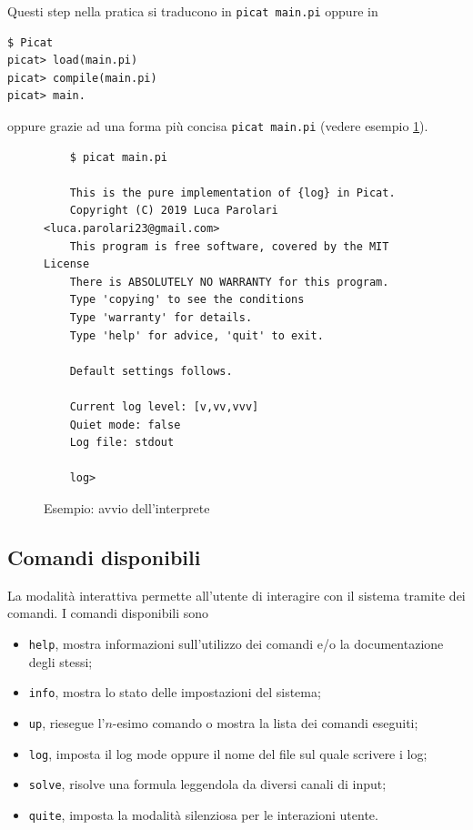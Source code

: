 \documentclass[12pt,a4paper,openright]{book} %
\begin{document}
Questi step nella pratica si traducono in \texttt{picat main.pi}
oppure in
\begin{verbatim}
$ Picat
picat> load(main.pi)
picat> compile(main.pi)
picat> main.
\end{verbatim}
oppure grazie ad una forma più concisa \texttt{picat main.pi} (vedere
esempio \ref{fig:example_interpreterstart}).

\begin{figure}
	\begin{verbatim}
	$ picat main.pi

	This is the pure implementation of {log} in Picat.
	Copyright (C) 2019 Luca Parolari <luca.parolari23@gmail.com>
	This program is free software, covered by the MIT License
	There is ABSOLUTELY NO WARRANTY for this program.
	Type 'copying' to see the conditions
	Type 'warranty' for details.
	Type 'help' for advice, 'quit' to exit.

	Default settings follows.

	Current log level: [v,vv,vvv]
	Quiet mode: false
	Log file: stdout

	log>
	\end{verbatim}
	\caption{Esempio: avvio dell'interprete}
	\label{fig:example_interpreterstart}
\end{figure}

\subsection{Comandi disponibili}

La modalità interattiva permette all'utente di interagire con il
sistema tramite dei comandi. I comandi disponibili sono
\begin{itemize}
	\item \texttt{help}, mostra informazioni sull'utilizzo dei
          comandi e/o la documentazione degli stessi;
	\item \texttt{info}, mostra lo stato delle impostazioni del
          sistema;
	\item \texttt{up}, riesegue l'$n$-esimo comando o mostra la
          lista dei comandi eseguiti;
	\item \texttt{log}, imposta il log mode oppure il nome del
          file sul quale scrivere i log;
	\item \texttt{solve}, risolve una formula leggendola da
          diversi canali di input;
	\item \texttt{quite}, imposta la modalità silenziosa per le
          interazioni utente.
\end{itemize}
\end{document}
